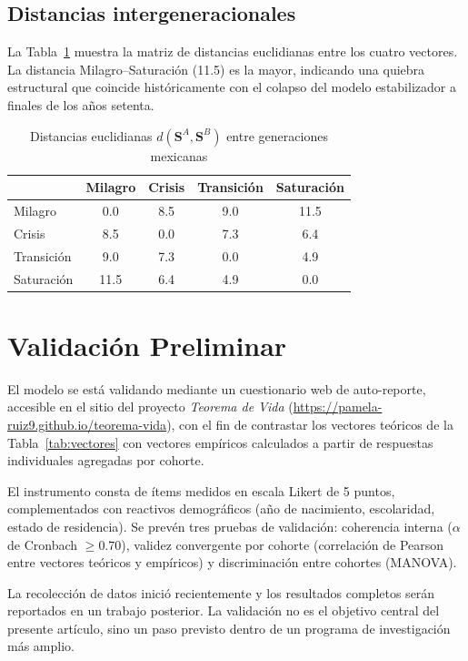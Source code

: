 \documentclass[conference,spanish]{IEEEtran}
\begin{document}
\subsection{Distancias intergeneracionales}

La Tabla~\ref{tab:distancias} muestra la matriz de distancias euclidianas entre los cuatro vectores. La distancia Milagro--Saturación (11.5) es la mayor, indicando una quiebra estructural que coincide históricamente con el colapso del modelo estabilizador a finales de los años setenta.

\begin{table}[htbp]
\caption{Distancias euclidianas $d(\mathbf{S}^A, \mathbf{S}^B)$ entre generaciones mexicanas}
\label{tab:distancias}
\begin{tabular}{lcccc}
\toprule
 & Milagro & Crisis & Transición & Saturación \\
\midrule
Milagro    & 0.0 & 8.5 & 9.0  & 11.5 \\
Crisis     & 8.5 & 0.0 & 7.3  & 6.4  \\
Transición & 9.0 & 7.3 & 0.0  & 4.9  \\
Saturación & 11.5 & 6.4 & 4.9 & 0.0  \\
\bottomrule
\end{tabular}
\end{table}

\section{Validación Preliminar}
\label{sec:validacion}

El modelo se está validando mediante un cuestionario web de auto-reporte, accesible en el sitio del proyecto \textit{Teorema de Vida} (\url{https://pamela-ruiz9.github.io/teorema-vida}), con el fin de contrastar los vectores teóricos de la Tabla~\ref{tab:vectores} con vectores empíricos calculados a partir de respuestas individuales agregadas por cohorte.

El instrumento consta de ítems medidos en escala Likert de 5 puntos, complementados con reactivos demográficos (año de nacimiento, escolaridad, estado de residencia). Se prevén tres pruebas de validación: coherencia interna ($\alpha$ de Cronbach $\geq 0.70$), validez convergente por cohorte (correlación de Pearson entre vectores teóricos y empíricos) y discriminación entre cohortes (MANOVA).

La recolección de datos inició recientemente y los resultados completos serán reportados en un trabajo posterior. La validación no es el objetivo central del presente artículo, sino un paso previsto dentro de un programa de investigación más amplio.
\end{document}
